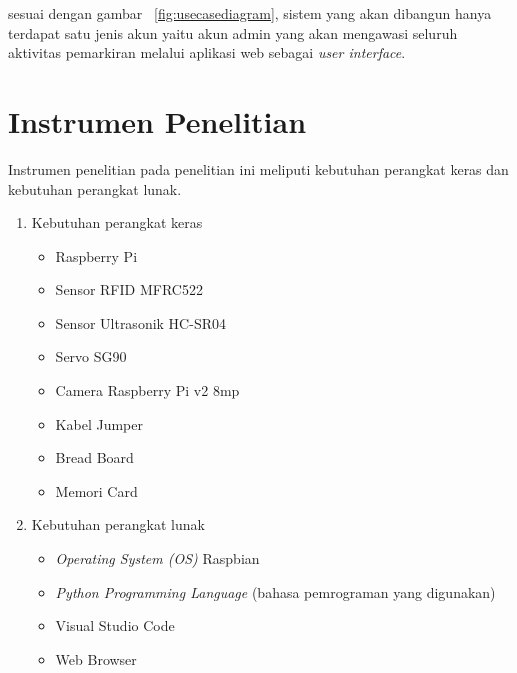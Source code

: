 sesuai dengan gambar ~\ref{fig:usecasediagram}, sistem yang akan dibangun hanya terdapat satu jenis akun yaitu akun admin yang akan mengawasi seluruh aktivitas pemarkiran melalui aplikasi web sebagai \textit{user interface}.

\section{Instrumen Penelitian}
Instrumen penelitian pada penelitian ini meliputi kebutuhan perangkat keras dan kebutuhan perangkat lunak.

\begin{enumerate}[topsep=0pt,itemsep=0pt,partopsep=0pt, parsep=0pt]
\item Kebutuhan perangkat keras
    \begin{itemize}[topsep=0pt,itemsep=0pt,partopsep=0pt, parsep=0pt,]
        \item Raspberry Pi
        \item Sensor RFID MFRC522
        \item Sensor Ultrasonik HC-SR04
        \item Servo SG90
        \item Camera Raspberry Pi v2 8mp
        \item Kabel Jumper
        \item Bread Board
        \item Memori Card
    \end{itemize}
\item Kebutuhan perangkat lunak
    \begin{itemize}[topsep=0pt,itemsep=0pt,partopsep=0pt, parsep=0pt,]
        \item \textit{Operating System (OS)} Raspbian
        \item \textit{Python Programming Language} (bahasa pemrograman yang digunakan)
        \item Visual Studio Code
        \item Web Browser
    \end{itemize}
\end{enumerate}